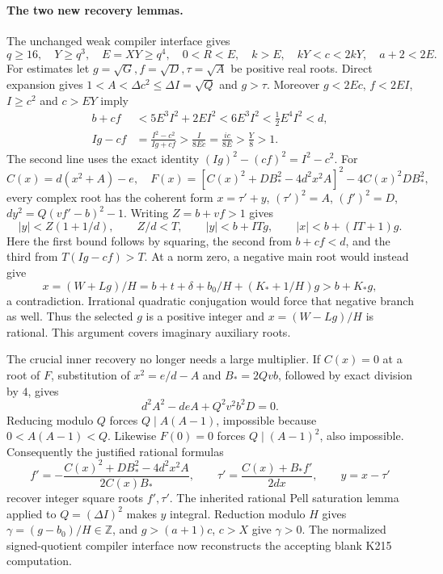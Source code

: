 \paragraph{The two new recovery lemmas.}
The unchanged weak compiler interface gives
\[
 q\ge16,\quad Y\ge q^3,\quad E=XY\ge q^4,
 \quad 0<R<E,\quad k>E,\quad kY<c<2kY,\quad a+2<2E.
\]
For estimates let $g=\sqrt G,f=\sqrt D,\tau=\sqrt A$ be positive real roots.
Direct expansion gives $1<A<\Delta c^2\le\Delta I=\sqrt Q$ and $g>\tau$.
Moreover $g<2Ec$, $f<2EI$, $I\ge c^2$ and $c>EY$ imply
\begin{align*}
 b+cf&<5E^3I^2+2EI^2<6E^3I^2<\tfrac12E^4I^2<d,\\
 Ig-cf&=\frac{I^2-c^2}{Ig+cf}
       >\frac{I}{8Ec}=\frac{ic}{8E}>\frac Y8>1.
\end{align*}
The second line uses the exact identity $(Ig)^2-(cf)^2=I^2-c^2$.
For
\[
 C(x)=d(x^2+A)-e,\quad
 F(x)=[C(x)^2+DB_*^2-4d^2x^2A]^2-4C(x)^2DB_*^2,
\]
every complex root has the coherent form
$x=\tau'+y$, $(\tau')^2=A$, $(f')^2=D$,
$dy^2=Q(vf'-b)^2-1$.
Writing $Z=b+vf>1$ gives
\[
 |y|<Z(1+1/d),\qquad Z/d<T,
 \qquad |y|<b+ITg,\qquad |x|<b+(IT+1)g.
\]
Here the first bound follows by squaring, the second from $b+cf<d$,
and the third from $T(Ig-cf)>T$.
At a norm zero, a negative main root would instead give
\[
 x=(W+Lg)/H=b+t+\delta+b_0/H+(K_*+1/H)g>b+K_*g,
\]
a contradiction.  Irrational quadratic conjugation would force that negative
branch as well.  Thus the selected $g$ is a positive integer and
$x=(W-Lg)/H$ is rational.  This argument covers imaginary auxiliary roots.

The crucial inner recovery no longer needs a large multiplier.
If $C(x)=0$ at a root of $F$, substitution of $x^2=e/d-A$ and
$B_*=2Qvb$, followed by exact division by $4$, gives
\[
 d^2A^2-deA+Q^2v^2b^2D=0.
\]
Reducing modulo $Q$ forces $Q\mid A(A-1)$, impossible because
$0<A(A-1)<Q$.  Likewise $F(0)=0$ forces $Q\mid(A-1)^2$, also impossible.
Consequently the justified rational formulas
\[
 f'= -\frac{C(x)^2+DB_*^2-4d^2x^2A}{2C(x)B_*},\qquad
 \tau'=\frac{C(x)+B_*f'}{2dx},\qquad y=x-\tau'
\]
recover integer square roots $f',\tau'$.  The inherited rational Pell
saturation lemma applied to $Q=(\Delta I)^2$ makes $y$ integral.
Reduction modulo $H$ gives $\gamma=(g-b_0)/H\in\mathbb Z$, and
$g>(a+1)c$, $c>X$ give $\gamma>0$.  The normalized signed-quotient
compiler interface now reconstructs the accepting blank K215 computation.


